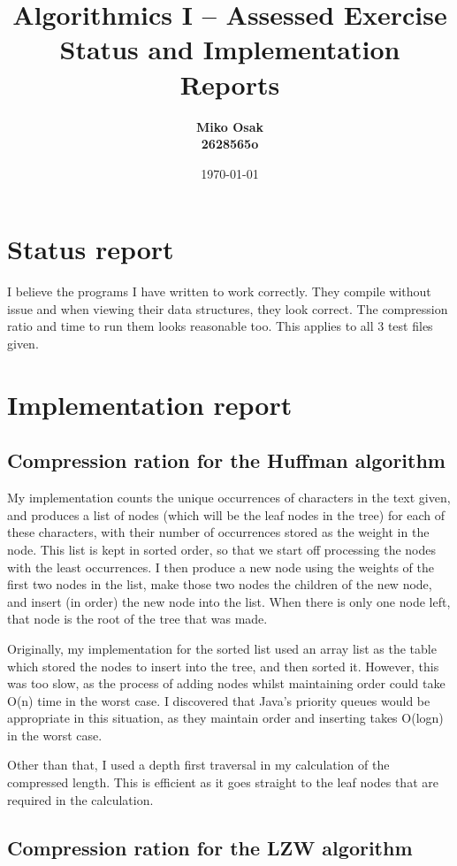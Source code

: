 \documentclass[]{article}
\title{Algorithmics I -- Assessed Exercise\\ \vspace{4mm} 
Status and Implementation Reports}
\author{\bf Miko Osak\\ \bf 2628565o}
\date{\today}
\begin{document}
\maketitle

\section*{Status report}

I believe the programs I have written to work correctly. They compile without issue and when viewing their data structures, they look correct. The compression ratio and time to run them looks reasonable too. This applies to all 3 test files given. 

\section*{Implementation report}

\subsection*{Compression ration for the Huffman algorithm}

My implementation counts the unique occurrences of characters in the text given, and produces a list of nodes (which will be the leaf nodes in the tree) for each of these characters, with their number of occurrences stored as the weight in the node. This list is kept in sorted order, so that we start off processing the nodes with the least occurrences. I then produce a new node using the weights of the first two nodes in the list, make those two nodes the children of the new node, and insert (in order) the new node into the list. When there is only one node left, that node is the root of the tree that was made.

Originally, my implementation for the sorted list used an array list as the table which stored the nodes to insert into the tree, and then sorted it. However, this was too slow, as the process of adding nodes whilst maintaining order could take O(n) time in the worst case. I discovered that Java's priority queues would be appropriate in this situation, as they maintain order and inserting takes O(logn) in the worst case.

Other than that, I used a depth first traversal in my calculation of the compressed length. This is efficient as it goes straight to the leaf nodes that are required in the calculation.

\subsection*{Compression ration for the LZW algorithm}
\end{document}
